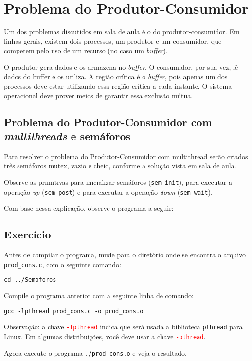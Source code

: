 \chapter{Problema do Produtor-Consumidor}
Um dos problemas discutidos em sala de aula é o do produtor-consumidor. Em linhas gerais, existem dois processos, um produtor e um consumidor, que competem pelo uso de um recurso (no caso um \textit{buffer}).

O produtor gera dados e os armazena no \textit{buffer}. O consumidor, por sua vez, lê dados do buffer e os utiliza. A região crítica é o \textit{buffer}, pois apenas um dos processos deve estar utilizando essa região crítica a cada instante. O sistema operacional deve prover meios de garantir essa exclusão mútua.


\section{Problema do Produtor-Consumidor com \textit{multithreads} e semáforos}
Para resolver o problema do Produtor-Consumidor com multithread serão criados três semáforos mutex, vazio e cheio, conforme a solução vista em sala de aula.

Observe as primitivas para inicializar semáforos (\texttt{sem\_init}), para executar a operação \textit{up} (\texttt{sem\_post}) e para executar a operação \textit{down} (\texttt{sem\_wait}).

Com base nessa explicação, observe o programa a seguir: 


\section{Exercício}
Antes de compilar o programa, mude para o diretório onde se encontra o arquivo \texttt{prod\_cons.c}, com o seguinte comando:

\begin{lstlisting}[style=MyBashStyle]
cd ../Semaforos
\end{lstlisting}

Compile o programa anterior com a seguinte linha de comando:

\begin{lstlisting}[style=MyBashStyle]
gcc -lpthread prod_cons.c -o prod_cons.o
\end{lstlisting}

\textcolor{orange}{\faWarning} Observação: a chave \textcolor{red}{\texttt{-lpthread}} indica que será usada a biblioteca \texttt{pthread} para Linux. Em algumas distribuições, você deve usar a chave \textcolor{red}{\texttt{-pthread}}.

Agora execute o programa \texttt{./prod\_cons.o} e veja o resultado.